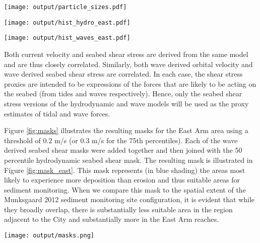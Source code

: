 \documentclass[a4paper]{article}
\let\origfigure=\figure
\let\endorigfigure=\endfigure
\renewenvironment{figure}[1][]{%
   \origfigure[H]
}{%
   \endorigfigure
}
\begin{document}
\begin{figure}
\centering\scriptsize
\texttt{[image: output/particle\_sizes.pdf]}
\caption{The percentage abundance of different sediment grain sizes
observed across the Munksgaard sediment sampling
program.\label{fig:particle_sizes}}
\end{figure}

\begin{figure}
\centering\scriptsize
\texttt{[image: output/hist\_hydro\_east.pdf]}
\caption{Frequency distributions of hydrodynamic products in the East
Arm area.\label{fig:hist_hydro_east}}
\end{figure}

\begin{figure}
\centering\scriptsize
\texttt{[image: output/hist\_waves\_east.pdf]}
\caption{Frequency distributions of wave modelling seabed shear stress
products in the East Arm area.\label{fig:hist_waves_east}}
\end{figure}

Both current velocity and seabed shear stress are derived from the same
model and are thus closely correlated. Similarly, both wave derived
orbital velocity and wave derived seabed shear stress are correlated. In
each case, the shear stress proxies are intended to be expressions of
the forces that are likely to be acting on the seabed (from tides and
waves respectively). Hence, only the seabed shear stress versions of the
hydrodynamic and wave models will be used as the proxy estimates of
tidal and wave forces.

Figure \ref{fig:masks} illustrates the resulting masks for the East Arm
area using a threshold of 0.2 m/s (or 0.3 m/s for the 75th percentiles).
Each of the wave derived seabed shear masks were added together and then
joined with the 50 percentile hydrodynamic seabed shear mask. The
resulting mask is illustrated in Figure \ref{fig:mask_east}. This mask
represents (in blue shading) the areas most likely to experience more
deposition than erosion and thus suitable areas for sediment monitoring.
When we compare this mask to the spatial extent of the Munksgaard 2012
sediment monitoring site configuration, it is evident that while they
broadly overlap, there is substantially less suitable area in the region
adjacent to the City and substantially more in the East Arm reaches.

\begin{figure}
\centering\scriptsize
\texttt{[image: output/masks.png]}
\caption{Individual East Arm masks from various hydrodynamic
(bedShear\_\emph{) and wave (beagle\_}) models categorised using a
threshold values of 0.2 for all other than the 75th percentile products
with use a threshold of 0.3 m/s. The blue areas indicate areas of
predicted relatively low erosion and transport potential and thus good
candidate areas for sample site allocation. The black dots illustrate
the position of Munksgaard 2012 sediment sampling
sites.\label{fig:masks}}
\end{figure}
\end{document}
